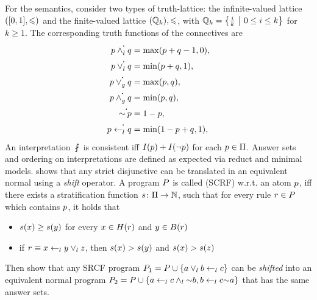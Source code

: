 For the semantics, \citet{Mushthofy2015} consider two types of truth-lattice: the infinite-valued lattice $([0,1],\leqslant)$ and the finite-valued lattice $(\mathbb{Q}_k),\leqslant$, with $\mathbb{Q}_k=\left\{\frac{i}{k}\ \middle\vert\  0\leq i\leq k\right\}$ for $k\geq1$.
The corresponding truth functions of the connectives are
\begin{align*}
    \atom\flpcontf{\lkand}\atomalt & = \max(\atom+\atomalt-1,0), \\
    \atom\flpcontf{\lkor}\atomalt  & = \min(\atom+\atomalt,1),   \\
    \atom\flpcontf{\gor}\atomalt   & = \max(\atom,\atomalt),     \\
    \atom\flpcontf{\gand}\atomalt  & = \min(\atom,\atomalt),     \\
    \flpnotf\atom                  & = 1-\atom,                  \\
    \atom\flpcontf{\lkif}\atomalt  & = \min(1-\atom+\atomalt,1),
\end{align*}
An interpretation $\fint$ is consistent iff $I(p)+I(\neg p)$ for each $p\in\Pi$.
Answer sets and ordering on interpretations are defined as expected via reduct and minimal models.
\citet{Mushthofy2015} shows that any strict disjunctive \fasptext can be translated in an equivalent normal \fasptext using a \emph{shift} operator.
A \fasptext program $P$ is called  (SCRF) w.r.t. an atom $p$, iff there exists a stratification function $s\colon\Pi\to\mathbb{N}$, such that for every rule $r\in P$ which contains $p$, it holds that
\begin{itemize}
    \item $s(x)\geq s(y)$ for every $x\in H(r)$ and $y\in B(r)$
    \item if $r\equiv x\overset{}{\gets}_l y \lor_l z$, then $s(x)>s(y)$ and $s(x)>s(z)$
\end{itemize}
Then \citet{Mushthofy2015} show that any SRCF program $P_1 = P\cup\left\{a\lor_l b\overset{}{\gets}_l c\right\}$ can be \emph{shifted} into an equivalent normal \flptext program $P_2 = P\cup\left\{a\overset{}{\gets}_l c \land_l \mathord{\sim} b, b\overset{}{\gets}_l c\mathord{\sim} a\right\}$ that has the same answer sets.


